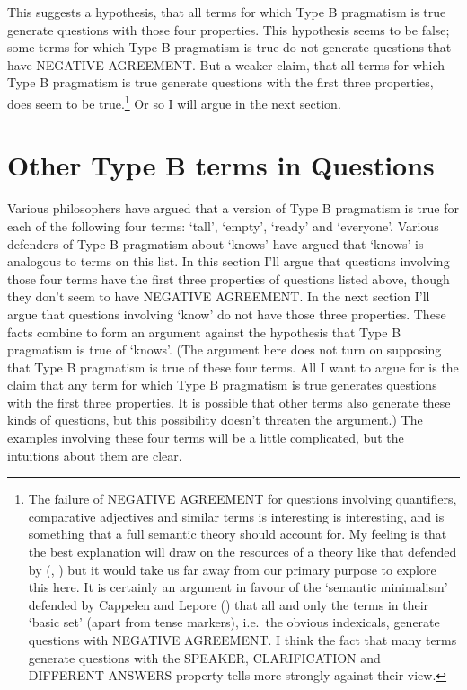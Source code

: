 \documentclass[
  11pt,
  letterpaper,
  DIV=11,
  numbers=noendperiod,
  twoside]{scrartcl}
\begin{document}
This suggests a hypothesis, that all terms for which Type B pragmatism
is true generate questions with those four properties. This hypothesis
seems to be false; some terms for which Type B pragmatism is true do not
generate questions that have NEGATIVE AGREEMENT. But a weaker claim,
that all terms for which Type B pragmatism is true generate questions
with the first three properties, does seem to be true.\footnote{The
  failure of NEGATIVE AGREEMENT for questions involving quantifiers,
  comparative adjectives and similar terms is interesting is
  interesting, and is something that a full semantic theory should
  account for. My feeling is that the best explanation will draw on the
  resources of a theory like that defended by
  (,
  ) but it would take us far away
  from our primary purpose to explore this here. It is certainly an
  argument in favour of the `semantic minimalism' defended by Cappelen
  and Lepore () that all and only the
  terms in their `basic set' (apart from tense markers), i.e.~the
  obvious indexicals, generate questions with NEGATIVE AGREEMENT. I
  think the fact that many terms generate questions with the SPEAKER,
  CLARIFICATION and DIFFERENT ANSWERS property tells more strongly
  against their view.} Or so I will argue in the next section.

\section{Other Type B terms in
Questions}\label{other-type-b-terms-in-questions}

Various philosophers have argued that a version of Type B pragmatism is
true for each of the following four terms: `tall', `empty', `ready' and
`everyone'. Various defenders of Type B pragmatism about `knows' have
argued that `knows' is analogous to terms on this list. In this section
I'll argue that questions involving those four terms have the first
three properties of questions listed above, though they don't seem to
have NEGATIVE AGREEMENT. In the next section I'll argue that questions
involving `know' do not have those three properties. These facts combine
to form an argument against the hypothesis that Type B pragmatism is
true of `knows'. (The argument here does not turn on supposing that Type
B pragmatism is true of these four terms. All I want to argue for is the
claim that any term for which Type B pragmatism is true generates
questions with the first three properties. It is possible that other
terms also generate these kinds of questions, but this possibility
doesn't threaten the argument.) The examples involving these four terms
will be a little complicated, but the intuitions about them are clear.
\end{document}
